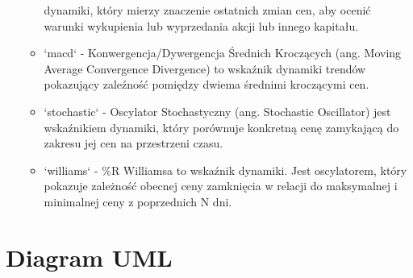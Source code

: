 \documentclass[12pt]{article}
\begin{document}
\begin{itemize}
\begin{itemize}
			dynamiki, który mierzy znaczenie ostatnich zmian cen, aby ocenić warunki wykupienia lub wyprzedania
			akcji lub innego kapitału.
			\item `macd` - Konwergencja/Dywergencja Średnich Kroczących (ang. Moving Average Convergence Divergence)
			to wskaźnik dynamiki trendów pokazujący zaleźność pomiędzy dwiema średnimi kroczącymi cen.
			\item `stochastic` - Oscylator Stochastyczny (ang. Stochastic Oscillator) jest wskaźnikiem dynamiki,
			który porównuje konkretną cenę zamykającą do zakresu jej cen na przestrzeni czasu.
			\item `williams` - \%R Williamsa to wskaźnik dynamiki. Jest oscylatorem, który pokazuje zależność obecnej ceny zamknięcia w relacji do
			maksymalnej i minimalnej ceny z poprzednich N dni.
		\end{itemize}
	\end{itemize}

	\section{Diagram UML}
\end{document}
